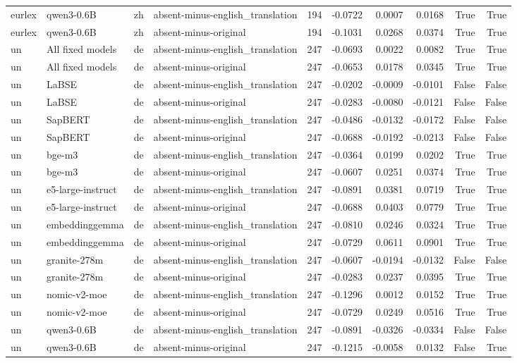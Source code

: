 \begin{tabular}{llllrrrrrr}
eurlex & qwen3-0.6B & zh & absent-minus-english\_translation & 194 & -0.0722 & 0.0007 & 0.0168 & True & True \\
eurlex & qwen3-0.6B & zh & absent-minus-original & 194 & -0.1031 & 0.0268 & 0.0374 & True & True \\
un & All fixed models & de & absent-minus-english\_translation & 247 & -0.0693 & 0.0022 & 0.0082 & True & True \\
un & All fixed models & de & absent-minus-original & 247 & -0.0653 & 0.0178 & 0.0345 & True & True \\
un & LaBSE & de & absent-minus-english\_translation & 247 & -0.0202 & -0.0009 & -0.0101 & False & False \\
un & LaBSE & de & absent-minus-original & 247 & -0.0283 & -0.0080 & -0.0121 & False & False \\
un & SapBERT & de & absent-minus-english\_translation & 247 & -0.0486 & -0.0132 & -0.0172 & False & False \\
un & SapBERT & de & absent-minus-original & 247 & -0.0688 & -0.0192 & -0.0213 & False & False \\
un & bge-m3 & de & absent-minus-english\_translation & 247 & -0.0364 & 0.0199 & 0.0202 & True & True \\
un & bge-m3 & de & absent-minus-original & 247 & -0.0607 & 0.0251 & 0.0374 & True & True \\
un & e5-large-instruct & de & absent-minus-english\_translation & 247 & -0.0891 & 0.0381 & 0.0719 & True & True \\
un & e5-large-instruct & de & absent-minus-original & 247 & -0.0688 & 0.0403 & 0.0779 & True & True \\
un & embeddinggemma & de & absent-minus-english\_translation & 247 & -0.0810 & 0.0246 & 0.0324 & True & True \\
un & embeddinggemma & de & absent-minus-original & 247 & -0.0729 & 0.0611 & 0.0901 & True & True \\
un & granite-278m & de & absent-minus-english\_translation & 247 & -0.0607 & -0.0194 & -0.0132 & False & False \\
un & granite-278m & de & absent-minus-original & 247 & -0.0283 & 0.0237 & 0.0395 & True & True \\
un & nomic-v2-moe & de & absent-minus-english\_translation & 247 & -0.1296 & 0.0012 & 0.0152 & True & True \\
un & nomic-v2-moe & de & absent-minus-original & 247 & -0.0729 & 0.0249 & 0.0516 & True & True \\
un & qwen3-0.6B & de & absent-minus-english\_translation & 247 & -0.0891 & -0.0326 & -0.0334 & False & False \\
un & qwen3-0.6B & de & absent-minus-original & 247 & -0.1215 & -0.0058 & 0.0132 & False & True \\
\bottomrule
\end{tabular}
